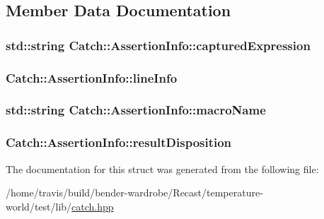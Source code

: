 \subsection{Member Data Documentation}
\hypertarget{struct_catch_1_1_assertion_info_af7c1d3cbfa346e9a303030fa0ef0cb54}{
\subsubsection[{captured\-Expression}]{\setlength{\rightskip}{0pt plus 5cm}std\-::string Catch\-::\-Assertion\-Info\-::captured\-Expression}}\label{struct_catch_1_1_assertion_info_af7c1d3cbfa346e9a303030fa0ef0cb54}
\hypertarget{struct_catch_1_1_assertion_info_a17bdbb404ba12658034f833be2f4c3e7}{
\subsubsection[{line\-Info}]{ Catch\-::\-Assertion\-Info\-::line\-Info}}\label{struct_catch_1_1_assertion_info_a17bdbb404ba12658034f833be2f4c3e7}
\hypertarget{struct_catch_1_1_assertion_info_ac2e59e8c89e00eb3390768f50d540b18}{
\subsubsection[{macro\-Name}]{\setlength{\rightskip}{0pt plus 5cm}std\-::string Catch\-::\-Assertion\-Info\-::macro\-Name}}\label{struct_catch_1_1_assertion_info_ac2e59e8c89e00eb3390768f50d540b18}
\hypertarget{struct_catch_1_1_assertion_info_a60353b3632ab2f827162f2b2d6911073}{
\subsubsection[{result\-Disposition}]{ Catch\-::\-Assertion\-Info\-::result\-Disposition}}\label{struct_catch_1_1_assertion_info_a60353b3632ab2f827162f2b2d6911073}


The documentation for this struct was generated from the following file\-:\begin{DoxyCompactItemize}
\item 
/home/travis/build/bender-\/wardrobe/\-Recast/temperature-\/world/test/lib/\hyperlink{catch_8hpp}{catch.\-hpp}\end{DoxyCompactItemize}
